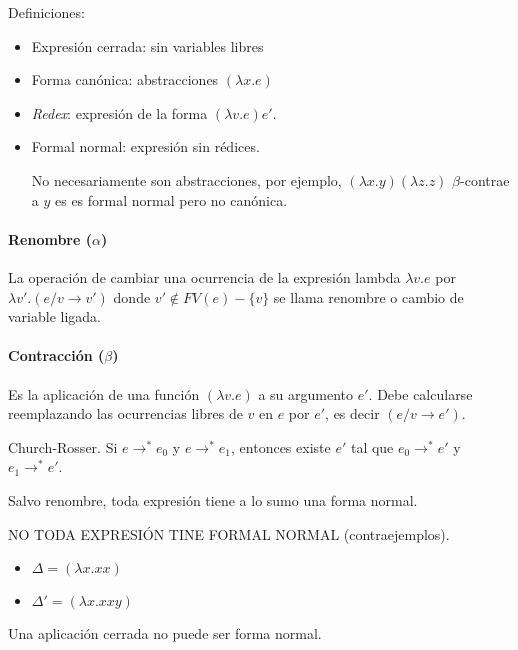 \documentclass[12pt,a4paper]{article}
\newcommand{\PN}{\par\noindent}
\newcommand{\totrans}{\to^\ast}
\begin{document}
    \PN Definiciones:
    \begin{itemize}
      \item Expresión cerrada: sin variables libres
      \item Forma canónica: abstracciones $(\lambda x.e)$
      \item \textit{Redex}: expresión de la forma $(\lambda v.e) e'$.
      \item Formal normal: expresión sin rédices.
        \PN No necesariamente son abstracciones, por ejemplo, $(\lambda x.y) (\lambda z.z)$ $\beta$-contrae a $y$ es es formal normal pero no canónica.
    \end{itemize}
        
    \paragraph{Renombre ($\alpha$)}
      La operación de cambiar una ocurrencia de la expresión lambda
        $\lambda v.e$ por $\lambda v'.(e/v \to v')$ donde
        $v' \not\in FV(e) - \{v\}$ se llama renombre o cambio de variable
        ligada.

    \paragraph{Contracción ($\beta$)}  
      Es la aplicación de una función
        $(\lambda v.e)$ a su argumento $e'$. Debe calcularse reemplazando las
        ocurrencias libres de $v$ en $e$ por $e'$, es decir $(e/v\to e')$.
        
    \begin{theorem}{Church-Rosser.}
      Si $e \totrans e_0$ y $e \totrans e_1$, entonces existe $e'$ tal que
      $e_0 \totrans e'$ y $e_1 \totrans e'$.
    \end{theorem}
        
    \begin{corollary}
      Salvo renombre, toda expresión tiene a lo sumo una forma normal.
    \end{corollary}

    \vspace{3mm}
    \PN NO TODA EXPRESIÓN TINE FORMAL NORMAL (contraejemplos).
    \begin{itemize}
      \item $\Delta = (\lambda x.xx)$
      \item $\Delta' = (\lambda x.xxy)$
    \end{itemize}

    \begin{property}
      Una aplicación cerrada no puede ser forma normal.
    \end{property}
\end{document}
